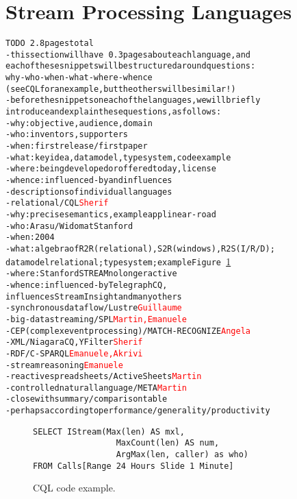 \section{Stream Processing Languages}\label{sec:languages}

\begin{alltt}TODO\scriptsize ~2.8 pages total
- this section will have ~0.3 pages about each language, and
  each of these snippets will be structured around questions:
  why-who-when-what-where-whence
  (see CQL for an example, but the others will be similar!)
- before the snippets on each of the languages, we will briefly
  introduce and explain these questions, as follows:
  - why: objective, audience, domain
  - who: inventors, supporters
  - when: first release / first paper
  - what: key idea, data model, type system, code example
  - where: being developed or offered today, license
  - whence: influenced-by and influences
- descriptions of individual languages
  - relational / CQL \cite{arasu_babu_widom_2006}   \textcolor{red}{Sherif}
    - why: precise semantics \cite{arasu_widom_2004}, example app linear-road \cite{arasu_et_al_2004}
    - who: Arasu/Widom at Stanford
    - when: 2004
    - what: algebra of R2R (relational), S2R (windows), R2S (I/R/D);
      data model relational; type system \cite{soule_et_al_2016}; example Figure~\ref{fig:cql}
    - where: Stanford STREAM no longer active
    - whence: influenced-by TelegraphCQ \cite{chandrasekaran_et_al_2003},
      influences StreamInsight \cite{ali_et_al_2009} and many others
  - synchronous dataflow / Lustre \cite{caspi_et_al_1987} \textcolor{red}{Guillaume}
  - big-data streaming / SPL \cite{hirzel_schneider_gedik_2017} \textcolor{red}{Martin, Emanuele}
  - CEP (complex event processing) / MATCH-RECOGNIZE \cite{zemke_et_al_2007} \cite{hirzel_2012} \textcolor{red}{Angela}
  - XML / NiagaraCQ \cite{chen_et_al_2000}, YFilter \cite{diao_et_al_2002} \textcolor{red}{Sherif}
  - RDF / C-SPARQL \cite{barbieri_et_al_2009} \textcolor{red}{Emanuele, Akrivi}
  - stream reasoning \textcolor{red}{Emanuele}
  - reactive spreadsheets / ActiveSheets \cite{vaziri_et_al_2014} \textcolor{red}{Martin}
  - controlled natural language / META \cite{arnold_et_al_2016} \textcolor{red}{Martin}
- close with summary/comparison table
  - perhaps according to performance/generality/productivity
\end{alltt}

\begin{figure}[!h]
\begin{lstlisting}
SELECT IStream(Max(len) AS mxl,
                 MaxCount(len) AS num,
                 ArgMax(len, caller) as who)
FROM Calls[Range 24 Hours Slide 1 Minute]
\end{lstlisting}
\vspace*{-4mm}
\caption{\label{fig:cql}CQL code example.}
\end{figure}

